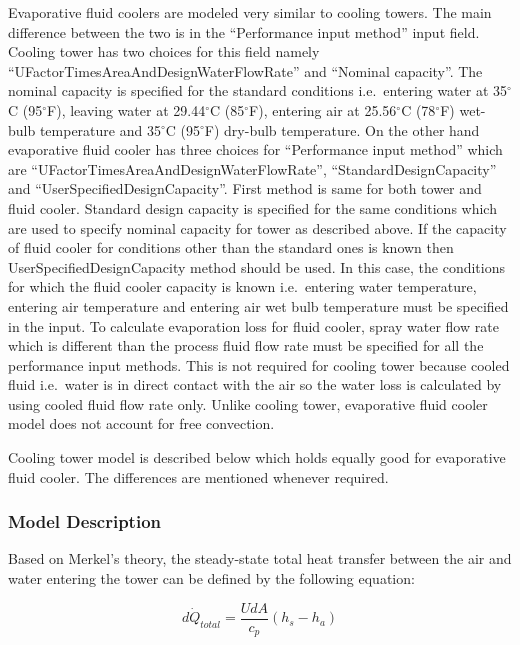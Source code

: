 Evaporative fluid coolers are modeled very similar to cooling towers. The main difference between the two is in the ``Performance input method'' input field. Cooling tower has two choices for this field namely ``UFactorTimesAreaAndDesignWaterFlowRate'' and ``Nominal capacity''. The nominal capacity is specified for the standard conditions i.e.~entering water at 35\(^{\circ}\)C (95\(^{\circ}\)F), leaving water at 29.44\(^{\circ}\)C (85\(^{\circ}\)F), entering air at 25.56\(^{\circ}\)C (78\(^{\circ}\)F) wet-bulb temperature and 35\(^{\circ}\)C (95\(^{\circ}\)F) dry-bulb temperature. On the other hand evaporative fluid cooler has three choices for ``Performance input method'' which are ``UFactorTimesAreaAndDesignWaterFlowRate'', ``StandardDesignCapacity'' and ``UserSpecifiedDesignCapacity''. First method is same for both tower and fluid cooler. Standard design capacity is specified for the same conditions which are used to specify nominal capacity for tower as described above. If the capacity of fluid cooler for conditions other than the standard ones is known then UserSpecifiedDesignCapacity method should be used. In this case, the conditions for which the fluid cooler capacity is known i.e.~entering water temperature, entering air temperature and entering air wet bulb temperature must be specified in the input. To calculate evaporation loss for fluid cooler, spray water flow rate which is different than the process fluid flow rate must be specified for all the performance input methods. This is not required for cooling tower because cooled fluid i.e.~water is in direct contact with the air so the water loss is calculated by using cooled fluid flow rate only. Unlike cooling tower, evaporative fluid cooler model does not account for free convection.

Cooling tower model is described below which holds equally good for evaporative fluid cooler. The differences are mentioned whenever required.

\subsubsection{Model Description}\label{model-description-008}

Based on Merkel's theory, the steady-state total heat transfer between the air and water entering the tower can be defined by the following equation:

\begin{equation}
d{\dot Q_{total}} = \frac{{UdA}}{{c_p}}\left( {{h_s} - {h_a}} \right)
\label{eq:MerkelTheorySteadyStateQtotal}
\end{equation}

